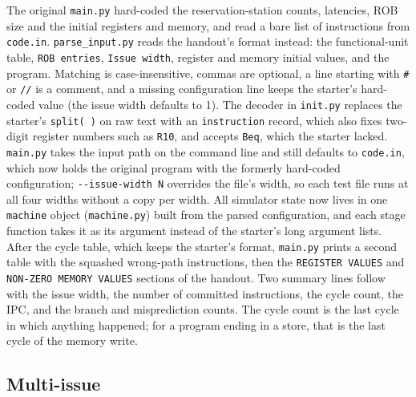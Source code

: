 \documentclass[11pt]{article}
\newcommand{\code}[1]{\texttt{#1}}
\begin{document}
The original \code{main.py} hard-coded the reservation-station counts, latencies, ROB size
and the initial registers and memory, and read a bare list of instructions from
\code{code.in}. \code{parse\_input.py} reads the handout's format instead: the
functional-unit table, \code{ROB entries}, \code{Issue width}, register and memory initial
values, and the program. Matching is case-insensitive, commas are optional, a line starting
with \code{\#} or \code{//} is a comment, and a missing configuration line keeps the
starter's hard-coded value (the issue width defaults to 1). The decoder in \code{init.py}
replaces the starter's \code{split(\textquotesingle\ \textquotesingle)} on raw text with an
\code{instruction} record, which also fixes two-digit register numbers such as \code{R10},
and accepts \code{Beq}, which the starter lacked. \code{main.py} takes the input path on the
command line and still defaults to \code{code.in}, which now holds the original program with
the formerly hard-coded configuration; \code{-{}-issue-width N} overrides the file's width,
so each test file runs at all four widths without a copy per width. All simulator state now
lives in one \code{machine} object (\code{machine.py}) built from the parsed configuration,
and each stage function takes it as its argument instead of the starter's long argument
lists. After the cycle table, which keeps the starter's format, \code{main.py} prints a
second table with the squashed wrong-path instructions, then the \code{REGISTER VALUES} and
\code{NON-ZERO MEMORY VALUES} sections of the handout. Two summary lines follow with the issue
width, the number of committed instructions, the cycle count, the IPC, and the branch and
misprediction counts. The cycle count is the last cycle in which anything happened; for a
program ending in a store, that is the last cycle of the memory write.

\subsection{Multi-issue}
\label{sec:issue}
\end{document}
